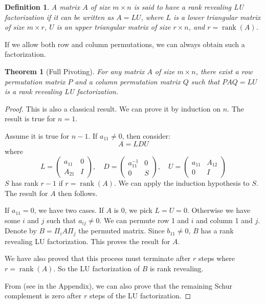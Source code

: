 \documentclass{article}
\DeclareMathOperator{\rk}{rank}
\newcommand{\by}{\times}
\newtheorem{theorem}{Theorem}[section]
\newtheorem{definition}{Definition}[section]
\begin{document}
\begin{definition}\label{def:rank_revealing}
    A matrix $A$ of size $m \by n$ is said to have a \emph{rank revealing LU factorization} if it can be written as $A = LU$, where $L$ is a lower triangular matrix of size $m \by r$, $U$ is an upper triangular matrix of size $r \by n$, and $r = \rk(A)$.
\end{definition}

If we allow both row and column permutations, we can always obtain such a factorization.

\begin{theorem}[Full Pivoting]\label{thm:row_column_permutation}
    For any matrix $A$ of size $m \by n$, there exist a row permutation matrix $P$ and a column permutation matrix $Q$ such that $PAQ = LU$ is a rank revealing LU factorization.
\end{theorem}

\begin{proof}
    This is also a classical result. We can prove it by induction on $n$. The result is true for $n=1$.

    Assume it is true for $n-1$. If $a_{11} \neq 0$, then consider:
    \[
        A = LDU
    \]
    where
    \[
        L = \begin{pmatrix}
            a_{11} & 0 \\
            A_{21} & I
        \end{pmatrix}, \quad
        D = \begin{pmatrix}
            a_{11}^{-1} & 0 \\
            0           & S
        \end{pmatrix}, \quad
        U = \begin{pmatrix}
            a_{11} & A_{12} \\
            0      & I
        \end{pmatrix}
    \]
    $S$ has rank $r-1$ if $r = \rk(A)$. We can apply the induction hypothesis to $S$. The result for $A$ then follows.

    If $a_{11} = 0$, we have two cases. If $A$ is 0, we pick $L=U=0$. Otherwise we have some $i$ and $j$ such that $a_{ij} \neq 0$. We can permute row 1 and $i$ and column 1 and $j$. Denote by $B = \Pi_i A \Pi_j$ the permuted matrix. Since $b_{11} \neq 0$, $B$ has a rank revealing LU factorization. This proves the result for $A$.

    We have also proved that this process must terminate after $r$ steps where $r = \rk(A)$. So the LU factorization of $B$ is rank revealing.

    From  (see  in the Appendix), we can also prove that the remaining Schur complement is zero after $r$ steps of the LU factorization.
\end{proof}
\end{document}
